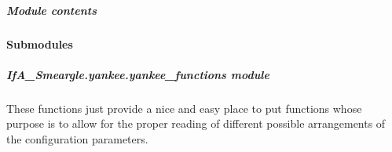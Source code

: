 \documentclass[letterpaper,10pt,english]{sphinxmanual}
\begin{document}
\subparagraph{Module contents}
\label{\detokenize{python_docstrings/IfA_Smeargle.yankee.configuration_classes:module-IfA_Smeargle.yankee.configuration_classes}}\label{\detokenize{python_docstrings/IfA_Smeargle.yankee.configuration_classes:module-contents}}

\paragraph{Submodules}
\label{\detokenize{python_docstrings/IfA_Smeargle.yankee:submodules}}

\subparagraph{IfA\_Smeargle.yankee.yankee\_functions module}
\label{\detokenize{python_docstrings/IfA_Smeargle.yankee.yankee_functions:module-IfA_Smeargle.yankee.yankee_functions}}\label{\detokenize{python_docstrings/IfA_Smeargle.yankee.yankee_functions:ifa-smeargle-yankee-yankee-functions-module}}\label{\detokenize{python_docstrings/IfA_Smeargle.yankee.yankee_functions::doc}}
These functions just provide a nice and easy place to put functions whose
purpose is to allow for the proper reading of different possible arrangements
of the configuration parameters.
\end{document}
